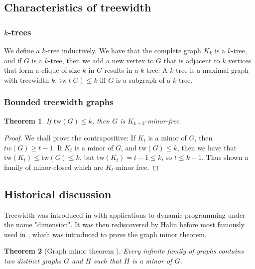 \documentclass[]{article}
\newcommand{\tw}{\text{tw}}
\newtheorem{theorem}{Theorem}
\theoremstyle{definition}
\numberwithin{theorem}{section}
\numberwithin{equation}{section}
\begin{document}
\subsection{Characteristics of treewidth}\label{ssec:characterising_Treewidth}
\subsubsection{$k$-trees}\label{sssec:k-trees}
We define a $k$-tree inductively. We have that the complete graph $K_k$ is a $k$-tree, and if $G$ is a $k$-tree, then we add a new vertex to $G$ that is adjacent to $k$ vertices that form a clique of size $k$ in $G$ results in a $k$-tree. 
A $k$-tree is a maximal graph with treewidth $k$. $\tw(G) \leq k$ iff $G$ is a subgraph of a $k$-tree. 


\subsubsection{Bounded treewidth graphs}\label{sssec:Graph_treewidth_Bounded}
\begin{theorem}\label{thm:treewidth_clique-minor-free}
	If $\tw(G) \leq k$, then $G$ is $K_{k+2}$-minor-free. 
\end{theorem}
\begin{proof}
	We shall prove the contrapositive: If $K_t$ is a minor of $G$, then $tw(G) \geq t-1$.
	If $K_t$ is a minor of $G$, and $\tw(G) \leq k$, then we have that $\tw(K_t) \leq \tw(G) \leq k$, but $\tw(K_t) = t-1 \leq k$, so $t \leq k + 1$. Thus shown a family of minor-closed which are $K_t$-minor free. 
\end{proof}

\subsection{Historical discussion}\label{ssec:tw_historical}
Treewidth was introduced in \cite{berteleChapterEliminationVariables1972} with applications to dynamic programming under the name "dimension". It was then rediscovered by Halin \cite{halinSfunctionsGraphs1976} before most famously used in \cite{robertsonGraphMinorsIII1984}, which was introduced to prove the graph minor theorem\cite{robertsonGraphMinorsXX2004}.

\begin{theorem}[Graph minor theorem \cite{robertsonGraphMinorsXX2004}]
	Every infinite family of graphs contains two distinct graphs $G$ and $H$ such that $H$ is a minor of $G$.
\end{theorem}
\end{document}
